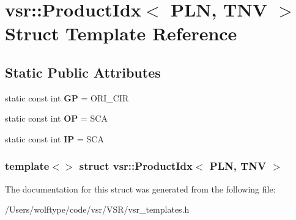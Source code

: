 \hypertarget{structvsr_1_1_product_idx_3_01_p_l_n_00_01_t_n_v_01_4}{\section{vsr\-:\-:Product\-Idx$<$ P\-L\-N, T\-N\-V $>$ Struct Template Reference}
\label{structvsr_1_1_product_idx_3_01_p_l_n_00_01_t_n_v_01_4}
}
\subsection*{Static Public Attributes}
\begin{DoxyCompactItemize}
\item 
\hypertarget{structvsr_1_1_product_idx_3_01_p_l_n_00_01_t_n_v_01_4_a163a46e50f4991bce0d8169bcc6c9dcd}{static const int {\bfseries G\-P} = O\-R\-I\-\_\-\-C\-I\-R}\label{structvsr_1_1_product_idx_3_01_p_l_n_00_01_t_n_v_01_4_a163a46e50f4991bce0d8169bcc6c9dcd}

\item 
\hypertarget{structvsr_1_1_product_idx_3_01_p_l_n_00_01_t_n_v_01_4_ac2d264f833a19da1c8f0d8cf392e9bd1}{static const int {\bfseries O\-P} = S\-C\-A}\label{structvsr_1_1_product_idx_3_01_p_l_n_00_01_t_n_v_01_4_ac2d264f833a19da1c8f0d8cf392e9bd1}

\item 
\hypertarget{structvsr_1_1_product_idx_3_01_p_l_n_00_01_t_n_v_01_4_a759a890449405fdd0c3abe04105173c1}{static const int {\bfseries I\-P} = S\-C\-A}\label{structvsr_1_1_product_idx_3_01_p_l_n_00_01_t_n_v_01_4_a759a890449405fdd0c3abe04105173c1}

\end{DoxyCompactItemize}
\subsubsection*{template$<$$>$ struct vsr\-::\-Product\-Idx$<$ P\-L\-N, T\-N\-V $>$}



The documentation for this struct was generated from the following file\-:\begin{DoxyCompactItemize}
\item 
/\-Users/wolftype/code/vsr/\-V\-S\-R/vsr\-\_\-templates.\-h\end{DoxyCompactItemize}

